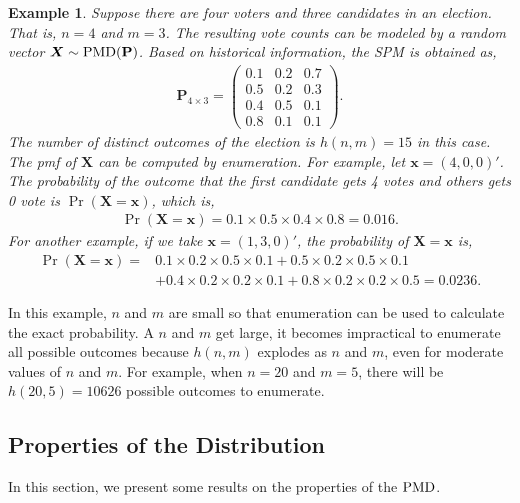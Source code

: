 \documentclass[12pt]{article}
\newcommand{\Pmat}{\mathbf{P}}
\newcommand{\PMD}{{\normalfont\textrm{PMD}}}
\newcommand{\Xvec}{\boldsymbol{X}}
\newcommand{\xvec}{\boldsymbol{x}}
\newcommand{\qedw}{\hfill \ensuremath{\Box}}
\newtheorem{example}{Example}
\begin{document}
\begin{example}%
Suppose there are four voters and three candidates in an election. That is, $n=4$ and $m=3$.   The resulting vote counts can be modeled by a random vector $\Xvec \sim \PMD(\Pmat)$. Based on historical information, the SPM is obtained as,
\begin{align*}
\Pmat_{4 \times 3} =
\begin{pmatrix}
0.1 &  0.2 & 0.7\\
0.5 & 0.2 & 0.3\\
0.4 &  0.5 & 0.1\\
0.8 & 0.1 & 0.1
\end{pmatrix}.
\end{align*}
The number of distinct outcomes of the election is $h(n,m)=15$ in this case. The pmf of $\Xvec$ can be computed by enumeration. For example, let $\xvec = (4,0,0)'$. The probability of the outcome that the first candidate gets 4 votes and others gets 0 vote is $\Pr(\Xvec=\xvec)$, which is,
\begin{align*}
\Pr\left( \Xvec = \xvec \right) = 0.1\times 0.5 \times 0.4 \times 0.8 = 0.016.
\end{align*}
For another example, if we take $\xvec=(1,3,0)'$, the probability of $\Xvec = \xvec$ is,
\begin{align*}
\Pr\left( \Xvec = \xvec \right)  =  & 0.1\times 0.2 \times 0.5 \times 0.1 +
 0.5\times0.2\times0.5 \times 0.1 \\
 & + 0.4\times0.2\times0.2\times0.1 + 0.8\times0.2\times0.2\times0.5 = 0.0236.
\end{align*}
\end{example}

In this example, $n$ and $m$ are small so that enumeration can be used to calculate the exact probability. A $n$ and $m$ get large, it becomes impractical to enumerate all possible outcomes because $h(n, m)$ explodes as $n$ and $m$, even for moderate values of $n$ and $m$. For example, when $n=20$ and $m=5$, there will be $h(20, 5)=10626$ possible outcomes to enumerate.



\subsection{Properties of the Distribution}\label{subsec:propty}
In this section, we present some results on the properties of the $\PMD$.
\end{document}
